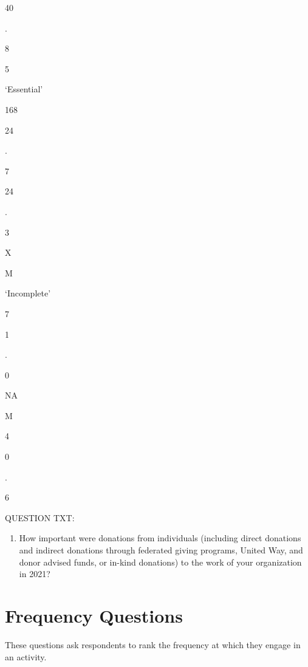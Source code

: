 \documentclass[
  letterpaper,
]{scrbook}
\providecommand{\tightlist}{%
  \setlength{\itemsep}{0pt}\setlength{\parskip}{0pt}}\usepackage{longtable,booktabs,array}
\begin{document}
40

.

8

5

`Essential'

168

24

.

7

24

.

3

X

M

`Incomplete'

7

1

.

0

NA

M

4

0

.

6

QUESTION TXT:

\begin{enumerate}
\def\labelenumi{\arabic{enumi}.}
\setcounter{enumi}{7}
\tightlist
\item
  How important were donations from individuals (including direct
  donations and indirect donations through federated giving programs,
  United Way, and donor advised funds, or in-kind donations) to the work
  of your organization in 2021?
\end{enumerate}

\chapter{Frequency Questions}\label{frequency-questions}

These questions ask respondents to rank the frequency at which they
engage in an activity.
\end{document}
